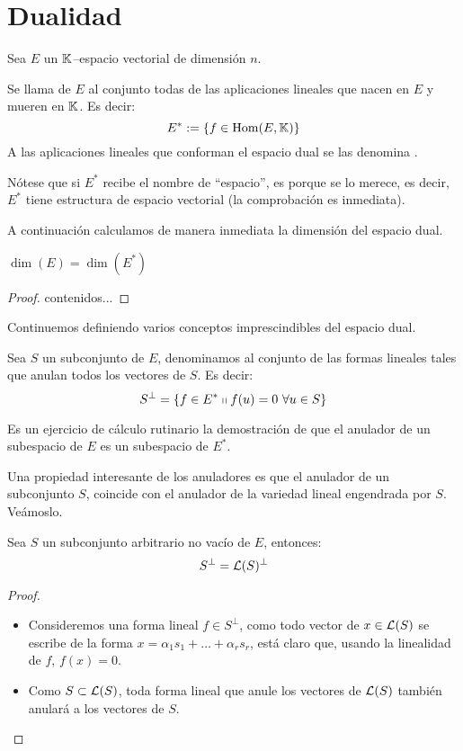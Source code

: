 \section{Dualidad}
Sea $E$ un $\mathbb{K}$--espacio vectorial de dimensión $n$.
\begin{defi}
	Se llama  de $E$ al conjunto todas de las aplicaciones lineales que nacen en $E$ y mueren en $\mathbb{K}$. Es decir:
	\[E^*:=\{f\in\mathrm{Hom}(E,\mathbb{K})\}\]
	A las aplicaciones lineales que conforman el espacio dual se las denomina .
\end{defi}
Nótese que si $E^*$ recibe el nombre de ``espacio'', es porque se lo merece, es decir, $E^*$ tiene estructura de espacio vectorial (la comprobación es inmediata).

A continuación calculamos de manera inmediata la dimensión del espacio dual.
\begin{lem}
	$\dim(E)=\dim(E^*)$
\end{lem}
\begin{proof}
	contenidos...
\end{proof}

Continuemos definiendo varios conceptos imprescindibles del espacio dual.
\begin{defi}
	Sea $S$ un subconjunto de $E$, denominamos  al conjunto de las formas lineales tales que anulan todos los vectores de $S$. Es decir:
	\[S^{\perp}=\{f\in E^*\tq f(u)=0\ \forall u\in S\}\]
\end{defi}
Es un ejercicio de cálculo rutinario la demostración de que el anulador de un subespacio de $E$ es un subespacio de $E^*$.

Una propiedad interesante de los anuladores es que el anulador de un subconjunto $S$, coincide con el anulador de la variedad lineal engendrada por $S$. Veámoslo.

\begin{lem} Sea $S$ un subconjunto arbitrario no vacío de $E$, entonces:
	\[S^{\perp}=\mathcal{L}(S)^{\perp}\]
\end{lem}\begin{proof}
\begin{itemize}
	\item[\bsubset] Consideremos una forma lineal $f\in S^{\perp}$, como todo vector de $x\in\mathcal{L}(S)$ se escribe de la forma $x=\alpha_1s_1+\dots+\alpha_rs_r$, está claro que, usando la linealidad de $f$, $f(x)=0$.
	\item[\bsetsub] Como $S\subset\mathcal{L}(S)$, toda forma lineal que anule los vectores de $\mathcal{L}(S)$ también anulará a los vectores de $S$.
\end{itemize}
\end{proof}
